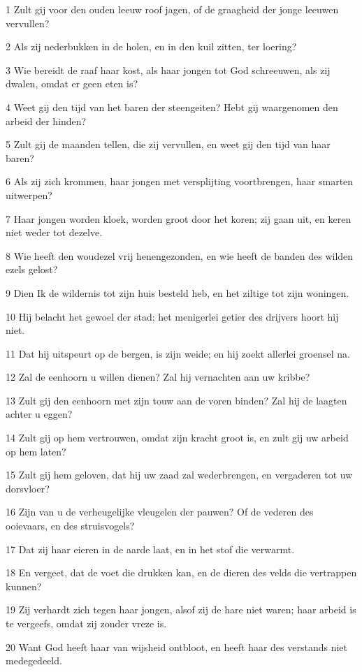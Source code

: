 \par 1 Zult gij voor den ouden leeuw roof jagen, of de graagheid der jonge leeuwen vervullen?
\par 2 Als zij nederbukken in de holen, en in den kuil zitten, ter loering?
\par 3 Wie bereidt de raaf haar kost, als haar jongen tot God schreeuwen, als zij dwalen, omdat er geen eten is?
\par 4 Weet gij den tijd van het baren der steengeiten? Hebt gij waargenomen den arbeid der hinden?
\par 5 Zult gij de maanden tellen, die zij vervullen, en weet gij den tijd van haar baren?
\par 6 Als zij zich krommen, haar jongen met versplijting voortbrengen, haar smarten uitwerpen?
\par 7 Haar jongen worden kloek, worden groot door het koren; zij gaan uit, en keren niet weder tot dezelve.
\par 8 Wie heeft den woudezel vrij henengezonden, en wie heeft de banden des wilden ezels gelost?
\par 9 Dien Ik de wildernis tot zijn huis besteld heb, en het ziltige tot zijn woningen.
\par 10 Hij belacht het gewoel der stad; het menigerlei getier des drijvers hoort hij niet.
\par 11 Dat hij uitspeurt op de bergen, is zijn weide; en hij zoekt allerlei groensel na.
\par 12 Zal de eenhoorn u willen dienen? Zal hij vernachten aan uw kribbe?
\par 13 Zult gij den eenhoorn met zijn touw aan de voren binden? Zal hij de laagten achter u eggen?
\par 14 Zult gij op hem vertrouwen, omdat zijn kracht groot is, en zult gij uw arbeid op hem laten?
\par 15 Zult gij hem geloven, dat hij uw zaad zal wederbrengen, en vergaderen tot uw dorsvloer?
\par 16 Zijn van u de verheugelijke vleugelen der pauwen? Of de vederen des ooievaars, en des struisvogels?
\par 17 Dat zij haar eieren in de aarde laat, en in het stof die verwarmt.
\par 18 En vergeet, dat de voet die drukken kan, en de dieren des velds die vertrappen kunnen?
\par 19 Zij verhardt zich tegen haar jongen, alsof zij de hare niet waren; haar arbeid is te vergeefs, omdat zij zonder vreze is.
\par 20 Want God heeft haar van wijsheid ontbloot, en heeft haar des verstands niet medegedeeld.

